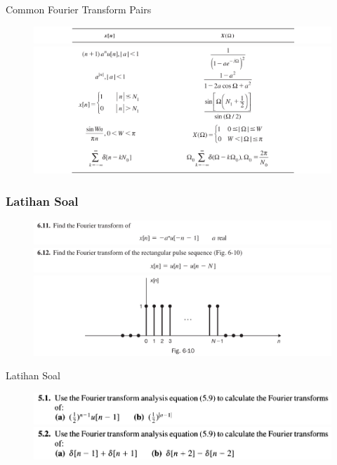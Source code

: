 \documentclass[pdflatex,compress,mathserif]{beamer}
\begin{document}
\begin{frame}{Common Fourier Transform Pairs}
	\begin{figure}
		\centering
		\includegraphics[width=\linewidth]{img/img22}
		\includegraphics[width=\linewidth]{img/img23}
	\end{figure}
\end{frame}

\begin{frame}
	\frametitle{Latihan Soal}
	\begin{figure}
		\centering
		\includegraphics[width=\linewidth]{img/img24}
		\includegraphics[width=\linewidth]{img/img25}
		\includegraphics[width=\linewidth]{img/img26}
	\end{figure}
\end{frame}

\begin{frame}{Latihan Soal}
	\begin{figure}
		\centering
		\includegraphics[width=\linewidth]{img/img27}
		\includegraphics[width=\linewidth]{img/img28}
	\end{figure}
\end{frame}
\end{document}
